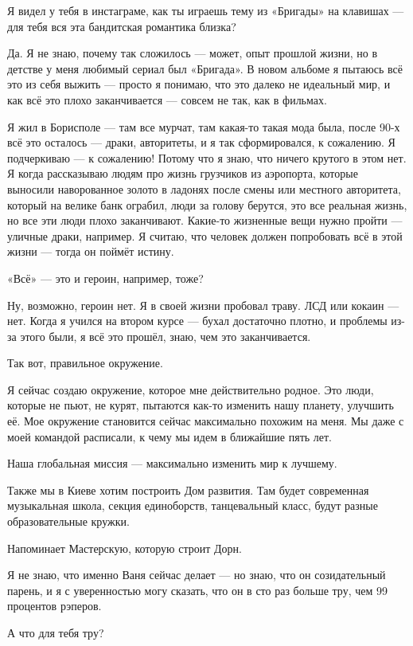 Я видел у тебя в инстаграме, как ты играешь тему из «Бригады» на клавишах --- для
тебя вся эта бандитская романтика близка?

Да. Я не знаю, почему так сложилось --- может, опыт прошлой жизни, но в детстве у
меня любимый сериал был «Бригада». В новом альбоме я пытаюсь всё это из себя
выжить --- просто я понимаю, что это далеко не идеальный мир, и как всё это плохо
заканчивается --- совсем не так, как в фильмах.

Я жил в Борисполе --- там все мурчат, там какая-то такая мода была, после 90-х
всё это осталось --- драки, авторитеты, и я так сформировался, к сожалению. Я
подчеркиваю --- к сожалению! Потому что я знаю, что ничего крутого в этом нет. Я
когда рассказываю людям про жизнь грузчиков из аэропорта, которые выносили
наворованное золото в ладонях после смены или местного авторитета, который на
велике банк ограбил, люди за голову берутся, это все реальная жизнь, но все эти
люди плохо заканчивают. Какие-то жизненные вещи нужно пройти --- уличные драки,
например. Я считаю, что человек должен попробовать всё в этой жизни --- тогда он
поймёт истину.

«Всё» --- это и героин, например, тоже?

Ну, возможно, героин нет. Я в своей жизни пробовал траву. ЛСД или кокаин --- нет.
Когда я учился на втором курсе --- бухал достаточно плотно, и проблемы из-за
этого были, я всё это прошёл, знаю, чем это заканчивается.

Так вот, правильное окружение.

Я сейчас создаю окружение, которое мне действительно родное. Это люди, которые
не пьют, не курят, пытаются как-то изменить нашу планету, улучшить её. Мое
окружение становится сейчас максимально похожим на меня. Мы даже с моей
командой расписали, к чему мы идем в ближайшие пять лет.

Наша глобальная миссия --- максимально изменить мир к лучшему.

Также мы в Киеве хотим построить Дом развития. Там будет современная
музыкальная школа, секция единоборств, танцевальный класс, будут разные
образовательные кружки.

Напоминает Мастерскую, которую строит Дорн.

Я не знаю, что именно Ваня сейчас делает --- но знаю, что он созидательный
парень, и я с уверенностью могу сказать, что он в сто раз больше тру, чем 99
процентов рэперов.

А что для тебя тру?

